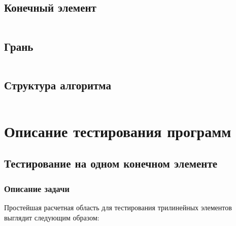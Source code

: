 \documentclass[12pt, a4paper]{article}
\begin{document}
\subsection{Конечный элемент}

\inputminted[firstline=9, lastline=45]{c}{/home/mehandes/c/src/github.com/meha4j/math/pde/fem/sse/include/fem/sse/hex.h}

\subsection{Грань}

\inputminted[firstline=8, lastline=77]{c}{/home/mehandes/c/src/github.com/meha4j/math/pde/fem/sse/include/fem/sse/fce.h}

\subsection{Структура алгоритма}

\inputminted[firstline=9, lastline=53]{c}{/home/mehandes/c/src/github.com/meha4j/math/pde/fem/sse/include/fem/sse/fem.h}

\section{Описание тестирования программ}
\subsection{Тестирование на одном конечном элементе}
\subsubsection{Описание задачи}

Простейшая расчетная область для тестирования трилинейных элементов выглядит следующим образом:
\end{document}
